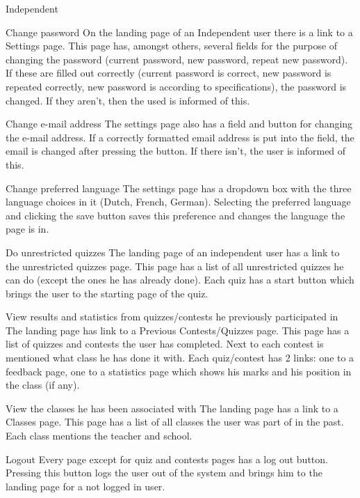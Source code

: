 \begin{section}{Independent}

    \begin{subsection}{Change password}
		\label{indep-pass}
		On the landing page of an Independent user there is a link to a Settings page. This page has, amongst others, several fields for the purpose of changing the password (current password, new password, repeat new password). If these are filled out correctly (current password is correct, new password is repeated correctly, new password is according to specifications), the password is changed. If they aren't, then the used is informed of this.
    \end{subsection}
    \begin{subsection}{Change e-mail address}
    	\label{indep-email}
    	The settings page also has a field and button for changing the e-mail address. If a correctly formatted email address is put into the field, the email is changed after pressing the button. If there isn't, the user is informed of this.
    \end{subsection}
    \begin{subsection}{Change preferred language}
    The settings page has a dropdown box with the three language choices in it (Dutch, French, German). Selecting the preferred language and clicking the save button saves this preference and changes the language the page is in.
    	\label{indep-lang}
    \end{subsection}
    \begin{subsection}{Do unrestricted quizzes}
    	\label{indep-unrest}
    	The landing page of an independent user has a link to the unrestricted quizzes page. This page has a list of all unrestricted quizzes he can do (except the ones he has already done). Each quiz has a start button which brings the user to the starting page of the quiz.
    \end{subsection}
    \begin{subsection}{View results and statistics from quizzes/contests he previously participated in}
    	\label{indep-resstat}
    	The landing page has link to a Previous Contests/Quizzes page. This page has a list of quizzes and contests the user has completed. Next to each contest is mentioned what class he has done it with. Each quiz/contest has 2 links: one to a feedback page, one to a statistics page which shows his marks and his position in the class (if any).
    \end{subsection}
    \begin{subsection}{View the classes he has been associated with}
    The landing page has a link to a Classes page. This page has a list of all classes the user was part of in the past. Each class mentions the teacher and school.
    	\label{indep-class}
    \end{subsection}
    \begin{subsection}{Logout}
    	\label{indep-logout}
    	Every page except for quiz and contests pages has a log out button. Pressing this button logs the user out of the system and brings him to the landing page for a not logged in user.
    \end{subsection}
    

\end{section}
